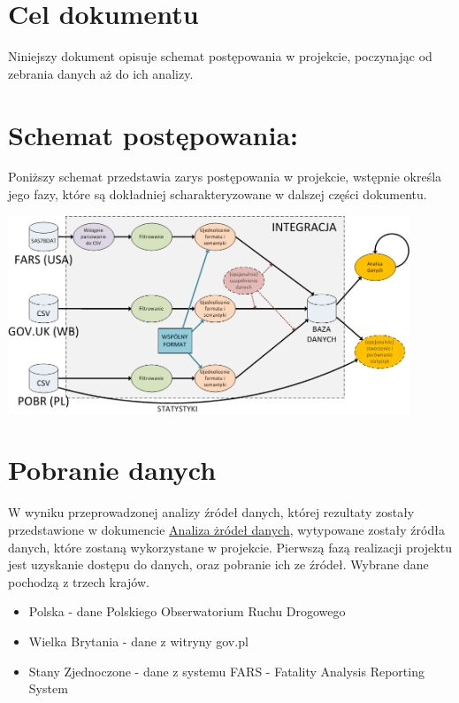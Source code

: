 \section{Cel dokumentu}\label{cel-dokumentu}

Niniejszy dokument opisuje schemat postępowania w projekcie, poczynając
od zebrania danych aż do ich analizy.

\section{Schemat postępowania:}\label{schemat-postepowania}

Poniższy schemat przedstawia zarys postępowania w projekcie, wstępnie
określa jego fazy, które są dokładniej scharakteryzowane w dalszej
części dokumentu.

\includegraphics[width=0.9\textwidth]{images/schemat_integracji.png}

\section{Pobranie danych}\label{pobranie-danych}

W wyniku przeprowadzonej analizy źródeł danych, której rezultaty zostały
przedstawione w dokumencie \href{Analiza-źródeł-danych}{Analiza żródeł
danych}, wytypowane zostały źródła danych, które zostaną wykorzystane w
projekcie. Pierwszą fazą realizacji projektu jest uzyskanie dostępu do
danych, oraz pobranie ich ze źródeł. Wybrane dane pochodzą z trzech
krajów.

\begin{itemize}
\itemsep1pt\parskip0pt
\item
  Polska - dane Polskiego Obserwatorium Ruchu Drogowego\\
\item
  Wielka Brytania - dane z witryny gov.pl\\
\item
  Stany Zjednoczone - dane z systemu FARS - Fatality Analysis Reporting
  System
\end{itemize}

